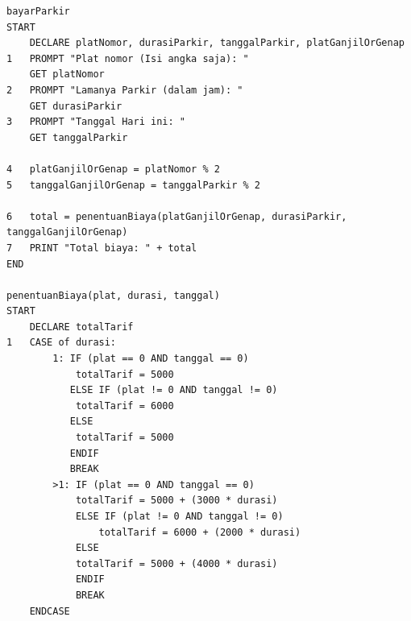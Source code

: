 \documentclass[
  11pt,
  answers  
]{exam}
\newcommand{\mytitle}{Programming Fundamentals (IF 130)}
\newcommand{\theauthor}{Rivo Juicer Wowor}
\newcommand{\affiliation}{00000059635}
\begin{document}

  \begin{questions}
    \question
    \begin{solution}
      \begin{lstlisting}
bayarParkir
START
	DECLARE platNomor, durasiParkir, tanggalParkir, platGanjilOrGenap
1	PROMPT "Plat nomor (Isi angka saja): "
	GET platNomor
2	PROMPT "Lamanya Parkir (dalam jam): "
	GET durasiParkir
3	PROMPT "Tanggal Hari ini: "
	GET tanggalParkir

4	platGanjilOrGenap = platNomor % 2
5	tanggalGanjilOrGenap = tanggalParkir % 2

6	total = penentuanBiaya(platGanjilOrGenap, durasiParkir, tanggalGanjilOrGenap)
7	PRINT "Total biaya: " + total
END

penentuanBiaya(plat, durasi, tanggal)
START
	DECLARE totalTarif
1	CASE of durasi:
		1: IF (plat == 0 AND tanggal == 0)
			totalTarif = 5000
		   ELSE IF (plat != 0 AND tanggal != 0)
			totalTarif = 6000
		   ELSE
			totalTarif = 5000	
		   ENDIF
		   BREAK
		>1: IF (plat == 0 AND tanggal == 0)
			totalTarif = 5000 + (3000 * durasi)
		    ELSE IF (plat != 0 AND tanggal != 0)
		        totalTarif = 6000 + (2000 * durasi)
		    ELSE
			totalTarif = 5000 + (4000 * durasi)
		    ENDIF
		    BREAK
	ENDCASE	
	

\end{lstlisting}
\end{solution}
\end{questions}
\end{document}
